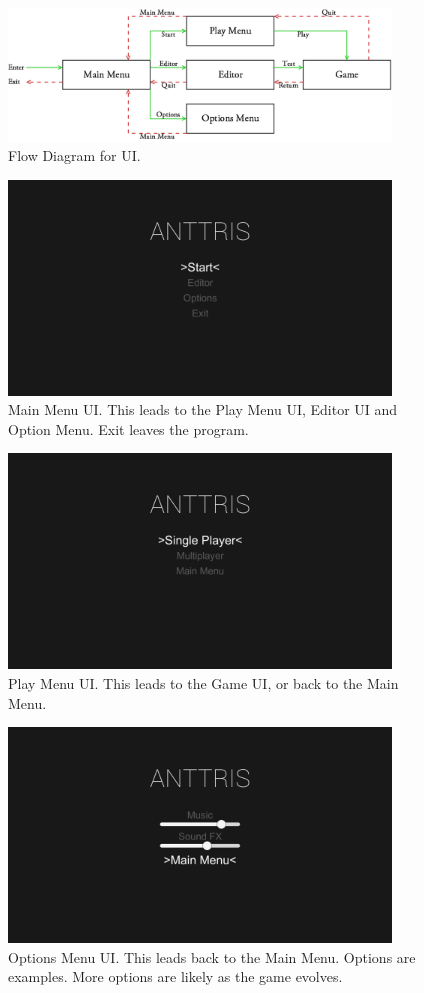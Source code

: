 \documentclass[12pt]{article}
\begin{document}
    \begin{figure}[H]
        \centering
        \includegraphics[width=4in]{UIFlow.png}
        \caption{Flow Diagram for UI.}
    \end{figure}
    \begin{figure}[H]
        \centering
        \includegraphics[width=4in]{MainMenu.png}
        \caption{Main Menu UI. This leads to the Play Menu UI, Editor UI and Option Menu. Exit leaves the program.}
    \end{figure}
    \begin{figure}[H]
        \centering
        \includegraphics[width=4in]{PlayMenu.png}
        \caption{Play Menu UI. This leads to the Game UI, or back to the Main Menu.}
    \end{figure}
    \begin{figure}[H]
        \centering
        \includegraphics[width=4in]{OptionsMenu.png}
        \caption{Options Menu UI. This leads back to the Main Menu. Options are examples. More options are likely as the game evolves.}
    \end{figure}
\end{document}
